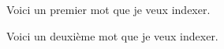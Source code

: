 \documentclass{book}
\begin{document}
\begin{pages}

\begin{Leftside}  
  \beginnumbering
  \pstart
  Voici un premier mot que je veux indexer.
  \pend
  \endnumbering
\end{Leftside}

\begin{Rightside}
  \beginnumbering
  \pstart
  Voici un deuxième mot que je veux indexer.
  \pend
  \endnumbering
\end{Rightside}

\end{pages}

\Pages

\printindex[mots]
\end{document}
